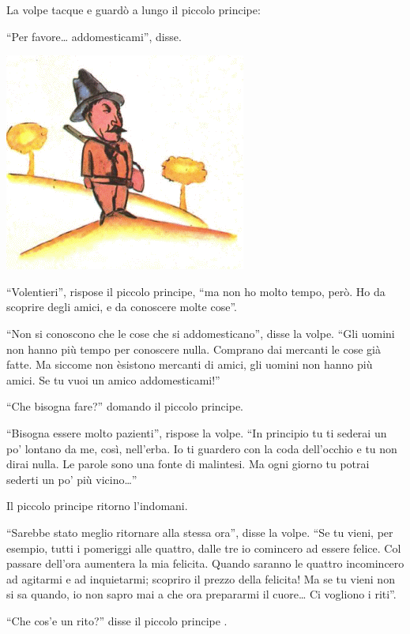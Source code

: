 \documentclass[11pt]{scrbook}
\begin{document}
La volpe tacque e guardò a lungo il piccolo principe:

``Per favore\ldots{} addomesticami'', disse.

\begin{center}
\includegraphics{img/myslivec}
\end{center}

``Volentieri'', rispose il piccolo principe, ``ma non ho molto tempo,
però. Ho da scoprire degli amici, e da conoscere molte cose''.

``Non si conoscono che le cose che si addomesticano'', disse la volpe.
``Gli uomini non hanno più tempo per conoscere nulla. Comprano dai
mercanti le cose già fatte. Ma siccome non èsistono mercanti di amici,
gli uomini non hanno più amici. Se tu vuoi un amico addomesticami!''

``Che bisogna fare?'' domando il piccolo principe.

``Bisogna essere molto pazienti'', rispose la volpe. ``In principio tu
ti sederai un po' lontano da me, così, nell'erba. Io ti guardero con la
coda dell'occhio e tu non dirai nulla. Le parole sono una fonte di
malintesi. Ma ogni giorno tu potrai sederti un po' più vicino\ldots{}''

Il piccolo principe ritorno l'indomani.

``Sarebbe stato meglio ritornare alla stessa ora'', disse la volpe. ``Se
tu vieni, per esempio, tutti i pomeriggi alle quattro, dalle tre io
comincero ad essere felice. Col passare dell'ora aumentera la mia
felicita. Quando saranno le quattro incomincero ad agitarmi e ad
inquietarmi; scopriro il prezzo della felicita! Ma se tu vieni non si sa
quando, io non sapro mai a che ora prepararmi il cuore\ldots{} Ci
vogliono i riti''.

``Che cos'e un rito?'' disse il piccolo principe .
\end{document}

